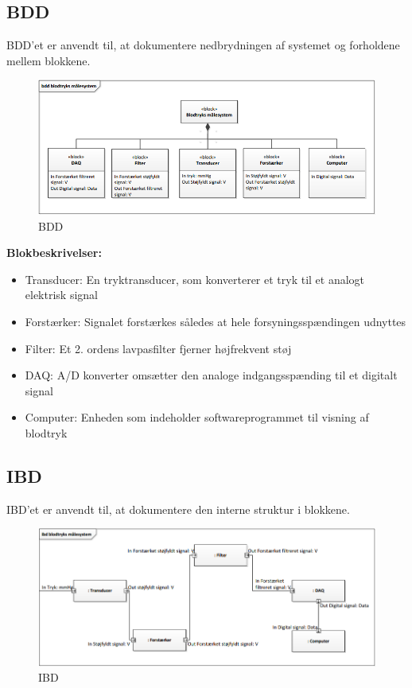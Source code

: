 \subsection{BDD}
BDD'et er anvendt til, at dokumentere nedbrydningen af systemet og forholdene mellem blokkene.  

\begin{figure}[H]
\centering
\includegraphics[scale=0.80]{bdd.PNG}
\caption{BDD}
\end{figure}

\textbf{Blokbeskrivelser:}
\begin{itemize}
\item Transducer: En tryktransducer, som konverterer et tryk til et analogt elektrisk signal
\item Forstærker: Signalet forstærkes således at hele forsyningsspændingen udnyttes
\item Filter: Et 2. ordens lavpasfilter fjerner højfrekvent støj
\item DAQ: A/D konverter omsætter den analoge indgangsspænding til et digitalt signal
\item Computer: Enheden som indeholder softwareprogrammet til visning af blodtryk
\end{itemize}
\subsection{IBD}
IBD'et er anvendt til, at dokumentere den interne struktur i blokkene.
\begin{figure}[H]
\centering
\includegraphics[scale=0.65]{ibd.PNG}
\caption{IBD}
\end{figure}




